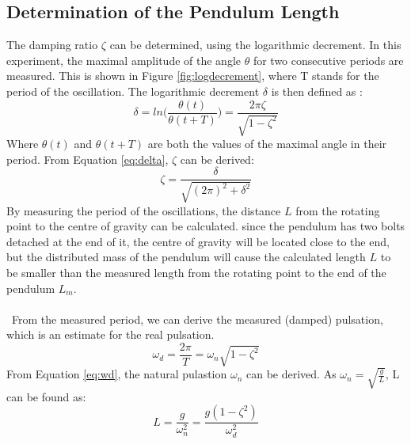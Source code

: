 \documentclass[a4paper,kul]{kulakarticle} %
\begin{document}
\subsection{Determination of the Pendulum Length}
The damping ratio $\zeta$ can be determined, using the logarithmic decrement. In this experiment, the maximal amplitude of the angle $\theta$ for two consecutive periods are measured. This is shown in Figure \ref{fig:logdecrement}, where T stands for the period of the oscillation. The logarithmic decrement $\delta$ is then defined as \cite{slidestrillingen}:
\begin{equation}
	\delta = ln\bigg(\frac{\theta(t)}{\theta(t+T)}\bigg) = \frac{2\pi\zeta}{\sqrt{1-\zeta^2}}
	\label{eq:delta}
	\end{equation}
	Where $\theta(t)$ and $\theta(t+T)$ are both the values of the maximal angle in their period. From Equation \ref{eq:delta}, $\zeta$ can be derived:
	\begin{equation}
	\zeta = \frac{\delta}{\sqrt{(2\pi)^2+\delta^2}}
\end{equation}
By measuring the period of the oscillations, the distance $L$ from the rotating point to the centre of gravity can be calculated. since the pendulum has two bolts detached at the end of it, the centre of gravity will be located close to the end, but the distributed mass of the pendulum will cause the calculated length $L$ to be smaller than the measured length from the rotating point to the end of the pendulum $L_m$.
\\\\\
From the measured period, we can derive the measured (damped) pulsation, which is an estimate for the real pulsation. 
\begin{equation}
	\omega_d = \frac{2\pi}{T} = \omega_n\sqrt{1-\zeta^2}
	\label{eq:wd}
	\end{equation}
	From Equation \ref{eq:wd}, the natural pulastion $\omega_n$ can be derived. As $\omega_n = \sqrt{\frac{g}{L}}$, L can be found as:
	\begin{equation}
	L = \frac{g}{\omega_n^2} = \frac{g(1-\zeta^2)}{\omega_d^2}
\end{equation}
\end{document}
